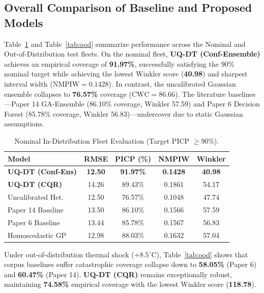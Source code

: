 \documentclass[journal,10pt,twocolumn]{article}
\begin{document}
\subsection{Overall Comparison of Baseline and Proposed Models}
Table~\ref{tab:nominal} and Table~\ref{tab:ood} summarize performance across the Nominal and Out-of-Distribution test fleets. On the nominal fleet, \textbf{UQ-DT (Conf-Ensemble)} achieves an empirical coverage of \textbf{91.97\%}, successfully satisfying the 90\% nominal target while achieving the lowest Winkler score (\textbf{40.98}) and sharpest interval width ($\text{NMPIW} = 0.1428$). In contrast, the uncalibrated Gaussian ensemble collapses to \textbf{76.57\%} coverage ($\text{CWC} = 86.66$). The literature baselines---Paper 14 GA-Ensemble \cite{wang2026digital} (86.10\% coverage, Winkler 57.59) and Paper 6 Decision Forest \cite{hosseinzadeh2023benchmarking} (85.78\% coverage, Winkler 56.83)---undercover due to static Gaussian assumptions.

\begin{table}[h]
\caption{Nominal In-Distribution Fleet Evaluation (Target PICP $\ge 90\%$).}
\label{tab:nominal}
\centering
\small
\begin{tabular}{lcccc}
\toprule
\textbf{Model} & \textbf{RMSE} & \textbf{PICP (\%)} & \textbf{NMPIW} & \textbf{Winkler} \\
\midrule
\textbf{UQ-DT (Conf-Ens)} & \textbf{12.50} & \textbf{91.97\%} & \textbf{0.1428} & \textbf{40.98} \\
\textbf{UQ-DT (CQR)} & 14.26 & 89.43\% & 0.1861 & 54.17 \\
Uncalibrated Het. & 12.50 & 76.57\% & 0.1048 & 47.74 \\
Paper 14 Baseline \cite{wang2026digital} & 13.50 & 86.10\% & 0.1566 & 57.59 \\
Paper 6 Baseline \cite{hosseinzadeh2023benchmarking} & 13.44 & 85.78\% & 0.1567 & 56.83 \\
Homoscedastic GP & 12.98 & 88.03\% & 0.1632 & 57.04 \\
\bottomrule
\end{tabular}
\end{table}

Under out-of-distribution thermal shock ($+8.5^\circ\text{C}$), Table~\ref{tab:ood} shows that corpus baselines suffer catastrophic coverage collapse down to \textbf{58.05\%} (Paper 6) and \textbf{60.47\%} (Paper 14). \textbf{UQ-DT (CQR)} remains exceptionally robust, maintaining \textbf{74.58\%} empirical coverage with the lowest Winkler score (\textbf{118.78}).
\end{document}
